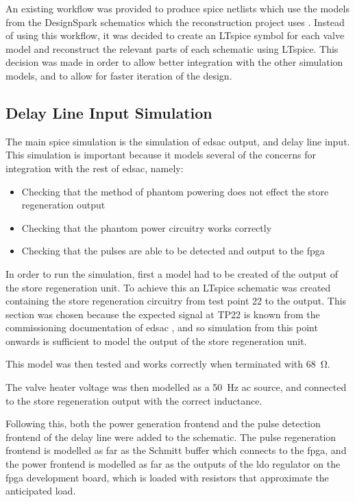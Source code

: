 An existing workflow was provided to produce \gls{spice} netlists which use the models from the DesignSpark \cite{rs2017} schematics which the reconstruction project uses \cite{linnington2015}. Instead of using this workflow, it was decided to create an LTspice symbol for each valve model and reconstruct the relevant parts of each schematic using LTspice. This decision was made in order to allow better integration with the other simulation models, and to allow for faster iteration of the design.

\subsection{Delay Line Input Simulation}
The main \gls{spice} simulation is the simulation of \gls{edsac} output, and delay line input. This simulation is important because it models several of the concerns for integration with the rest of \gls{edsac}, namely:
\begin{itemize}
	\item Checking that the method of phantom powering does not effect the store regeneration output
	\item Checking that the phantom power circuitry works correctly
	\item Checking that the pulses are able to be detected and output to the \gls{fpga}
\end{itemize}

In order to run the simulation, first a model had to be created of the output of the store regeneration unit. To achieve this an LTspice schematic was created containing the store regeneration circuitry from test point 22 to the output. This section was chosen because the expected signal at TP22 is known from the commissioning documentation of \gls{edsac} \cite[p.7]{linnington2016b}, and so simulation from this point onwards is sufficient to model the output of the store regeneration unit.

This model was then tested and works correctly when terminated with \SI{68}{\ohm}.

The valve heater voltage was then modelled as a \SI{50}{\hertz} \gls{ac} source, and connected to the store regeneration output with the correct inductance.

Following this, both the power generation frontend and the pulse detection frontend of the delay line were added to the schematic. The pulse regeneration frontend is modelled as far as the Schmitt buffer which connects to the \gls{fpga}, and the power frontend is modelled as far as the outputs of the \gls{ldo} regulator on the \gls{fpga} development board, which is loaded with resistors that approximate the anticipated load.

